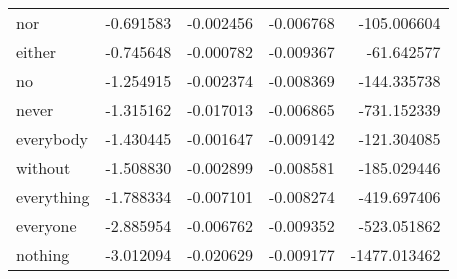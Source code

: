 \begin{table}[ht]
\begin{tabular}{lrrrr}
nor & {\cellcolor[HTML]{F9EBE3}} \color[HTML]{000000} -0.691583 & {\cellcolor[HTML]{337EB8}} \color[HTML]{F1F1F1} -0.002456 & {\cellcolor[HTML]{2F79B5}} \color[HTML]{F1F1F1} -0.006768 & {\cellcolor[HTML]{337EB8}} \color[HTML]{F1F1F1} -105.006604 \\
either & {\cellcolor[HTML]{F9EEE7}} \color[HTML]{000000} -0.745648 & {\cellcolor[HTML]{3480B9}} \color[HTML]{F1F1F1} -0.000782 & {\cellcolor[HTML]{0F437B}} \color[HTML]{F1F1F1} -0.009367 & {\cellcolor[HTML]{337EB8}} \color[HTML]{F1F1F1} -61.642577 \\
no & {\cellcolor[HTML]{F3F5F6}} \color[HTML]{000000} -1.254915 & {\cellcolor[HTML]{337EB8}} \color[HTML]{F1F1F1} -0.002374 & {\cellcolor[HTML]{1B5A9C}} \color[HTML]{F1F1F1} -0.008369 & {\cellcolor[HTML]{337EB8}} \color[HTML]{F1F1F1} -144.335738 \\
never & {\cellcolor[HTML]{F0F4F6}} \color[HTML]{000000} -1.315162 & {\cellcolor[HTML]{2870B1}} \color[HTML]{F1F1F1} -0.017013 & {\cellcolor[HTML]{2E77B5}} \color[HTML]{F1F1F1} -0.006865 & {\cellcolor[HTML]{2E77B5}} \color[HTML]{F1F1F1} -731.152339 \\
everybody & {\cellcolor[HTML]{ECF2F5}} \color[HTML]{000000} -1.430445 & {\cellcolor[HTML]{3480B9}} \color[HTML]{F1F1F1} -0.001647 & {\cellcolor[HTML]{124984}} \color[HTML]{F1F1F1} -0.009142 & {\cellcolor[HTML]{337EB8}} \color[HTML]{F1F1F1} -121.304085 \\
without & {\cellcolor[HTML]{EAF1F5}} \color[HTML]{000000} -1.508830 & {\cellcolor[HTML]{337EB8}} \color[HTML]{F1F1F1} -0.002899 & {\cellcolor[HTML]{185493}} \color[HTML]{F1F1F1} -0.008581 & {\cellcolor[HTML]{337EB8}} \color[HTML]{F1F1F1} -185.029446 \\
everything & {\cellcolor[HTML]{E0ECF3}} \color[HTML]{000000} -1.788334 & {\cellcolor[HTML]{307AB6}} \color[HTML]{F1F1F1} -0.007101 & {\cellcolor[HTML]{1C5C9F}} \color[HTML]{F1F1F1} -0.008274 & {\cellcolor[HTML]{307AB6}} \color[HTML]{F1F1F1} -419.697406 \\
everyone & {\cellcolor[HTML]{ACD2E5}} \color[HTML]{000000} -2.885954 & {\cellcolor[HTML]{307AB6}} \color[HTML]{F1F1F1} -0.006762 & {\cellcolor[HTML]{0F437B}} \color[HTML]{F1F1F1} -0.009352 & {\cellcolor[HTML]{2F79B5}} \color[HTML]{F1F1F1} -523.051862 \\
nothing & {\cellcolor[HTML]{A5CEE3}} \color[HTML]{000000} -3.012094 & {\cellcolor[HTML]{246AAE}} \color[HTML]{F1F1F1} -0.020629 & {\cellcolor[HTML]{114781}} \color[HTML]{F1F1F1} -0.009177 & {\cellcolor[HTML]{276EB0}} \color[HTML]{F1F1F1} -1477.013462 \\

\end{tabular}
\end{table}
